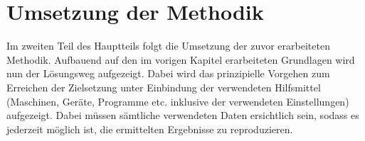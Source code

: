 \chapter{Umsetzung der Methodik}
\label{chap:Durchfuehrung}
Im zweiten Teil des Hauptteils folgt die Umsetzung der zuvor erarbeiteten Methodik. Aufbauend auf den im vorigen Kapitel erarbeiteten Grundlagen  wird nun der Lösungsweg aufgezeigt. Dabei wird das prinzipielle Vorgehen zum Erreichen der Zielsetzung unter Einbindung der verwendeten Hilfsmittel (Maschinen, Geräte, Programme etc. inklusive der verwendeten Einstellungen) aufgezeigt. Dabei müssen sämtliche verwendeten Daten ersichtlich sein, sodass es jederzeit möglich ist, die ermittelten Ergebnisse zu reproduzieren. 